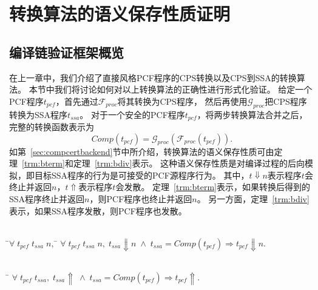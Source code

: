 
\chapter{转换算法的语义保存性质证明} \label{ch:verify}

\section{编译链验证框架概览} \label{sec:verifyoverview}

在上一章中，我们介绍了直接风格PCF程序的CPS转换以及CPS到SSA的转换算法。
本节中我们将讨论如何对以上转换算法的正确性进行形式化验证。
给定一个PCF程序$t_{pcf}$，首先通过$\mathcal{F}_{proc}$将其转换为CPS程序，
然后再使用$\mathcal{G}_{proc}$把CPS程序转换为SSA程序$t_{ssa}$。
对于一个安全的PCF程序$t_{pcf}$，将两步转换算法合并之后，完整的转换函数表示为
\begin{equation}
Comp(t_{pcf}) = \mathcal{G}_{proc}(\mathcal{F}_{proc}(t_{pcf})).
\end{equation}
如第~\ref{sec:compcertbackend}节中所介绍，转换算法的语义保存性质可由定理~\ref{trm:bterm}和定理~\ref{trm:bdiv}表示。
这种语义保存性质是对编译过程的后向模拟，即目标SSA程序的行为是可接受的PCF源程序行为。
其中，$t \Downarrow n$表示程序$t$会终止并返回$n$，$t \Uparrow$表示程序$t$会发散。
定理~\ref{trm:bterm}表示，如果转换后得到的SSA程序终止并返回$n$，则PCF程序也终止并返回$n$。
另一方面，定理~\ref{trm:bdiv}表示，如果SSA程序发散，则PCF程序也发散。

\begin{theorem}[程序终止行为的保存]\label{trm:bterm} 
    \begin{tabbing}
     \\
    \quad\=$\forall \; t_{pcf}\; t_{ssa}\; n,\; $\=\kill
    \>$\forall \; t_{pcf}\; t_{ssa}\; n,\; t_{ssa}\Downarrow n\; \wedge \; t_{ssa}=Comp(t_{pcf}) \Longrightarrow t_{pcf}\Downarrow n.$
    \end{tabbing}
  \end{theorem}
  
  \begin{theorem}[程序发散行为的保存]\label{trm:bdiv}
    \begin{tabbing}
      \\
    \quad\=\kill
    \>$\forall \; t_{pcf}\; t_{ssa},\; t_{ssa}\Uparrow\; \wedge \; t_{ssa}=Comp(t_{pcf})\Longrightarrow t_{pcf}\Uparrow.$
    \end{tabbing}
  \end{theorem}

